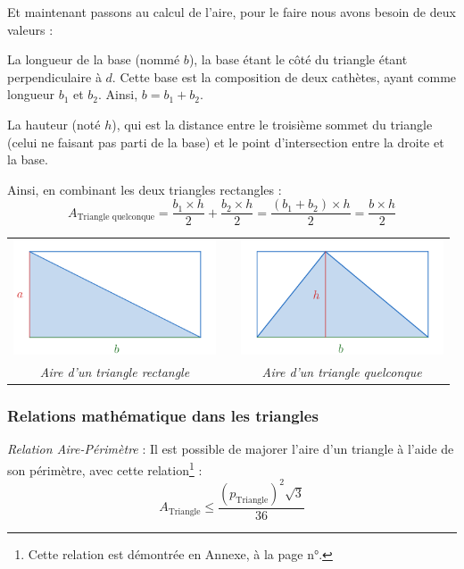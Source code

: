 \documentclass[a4paper, twoside]{article}
\begin{document}
\medbreak

Et maintenant passons au calcul de l'aire,
pour le faire nous avons besoin de deux valeurs :

La longueur de la base (nommé $b$),
la base étant le côté du triangle étant perpendiculaire à $d$.
Cette base est la composition de deux cathètes, ayant comme longueur $b_1$ et $b_2$.
Ainsi, $b = b_1 + b_2$.

La hauteur (noté $h$),
qui est la distance entre le troisième sommet du triangle (celui ne faisant pas parti de la base) et le point d'intersection entre la droite et la base.

Ainsi, en combinant les deux triangles rectangles :
$$ A_{\text{Triangle quelconque}} = \frac{b_1 \times h}{2} + \frac{b_2 \times h}{2} = \frac{(b_1+b_2) \times h}{2} = \frac{b \times h}{2} $$

\begin{center}
	\begin{tabular}{ccc}
		\includegraphics[width=6cm]{Image/Aire triangle rectangle.png} &               & \includegraphics[width=6cm]{Image/Aire triangle quelconque.png} \\
		\textit{Aire d'un triangle rectangle}                          & \phantom{cou} & \textit{Aire d'un triangle quelconque}                          \\
	\end{tabular}
\end{center}

\subsubsection{Relations mathématique dans les triangles}

\emph{Relation Aire-Périmètre} : Il est possible de majorer l'aire d'un
triangle à l'aide de son périmètre, avec cette relation\footnote{
	Cette relation est démontrée en Annexe, à la page n°\pageref{relation_aire_perim_triangle}.
} :
$$ A_{\text{Triangle}} \leq \frac{(p_{\text{Triangle}})^2 \sqrt {3}} {36} $$
\end{document}
